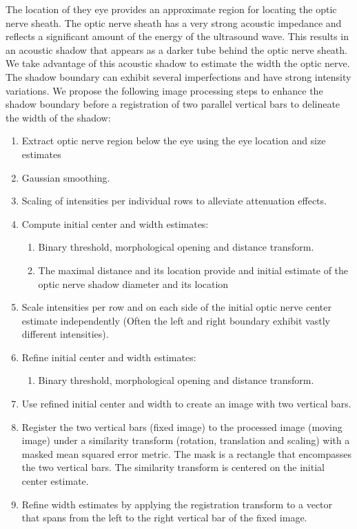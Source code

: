\documentclass{llncs}
\begin{document}
The location of they eye provides an approximate region for locating the optic
nerve sheath. The optic nerve sheath has a very strong acoustic impedance and
reflects a significant amount of the energy of the ultrasound wave. This
results in an acoustic shadow that appears as a darker tube behind the optic
nerve sheath.  We take advantage of this acoustic shadow to estimate the width
the optic nerve.  The shadow boundary can exhibit several imperfections and
have strong intensity variations. We propose the following image processing
steps to enhance the shadow boundary before a registration of two parallel
vertical bars to delineate the width of the shadow:
\begin{enumerate}
\item Extract optic nerve region below the eye using the eye location and size estimates
\item Gaussian smoothing.
\item Scaling of intensities per individual rows to alleviate attenuation effects.
\item Compute initial center and width estimates:
  \begin{enumerate}
  \item Binary threshold, morphological opening and distance transform.
  \item The maximal distance and its location provide and initial estimate of the
          optic nerve shadow diameter and its location
  \end{enumerate}
\item Scale intensities per row and on each side of the initial optic nerve
      center estimate independently (Often the left and right boundary exhibit
      vastly different intensities). 
\item Refine initial center and width estimates:
  \begin{enumerate}
  \item Binary threshold, morphological opening and distance transform.
  \end{enumerate}
\item Use refined initial center and width to create an image with two vertical bars. 
\item Register the two vertical bars (fixed image) to the processed image (moving
      image) under a similarity transform (rotation, translation and scaling)
      with a masked mean squared error metric. The mask is a rectangle that
      encompasses the two vertical bars. The similarity transform is centered on
      the initial  center estimate.
\item Refine width estimates by applying the registration transform to a vector
      that spans from the left to the right vertical bar of the fixed image.
\end{enumerate}
\end{document}
